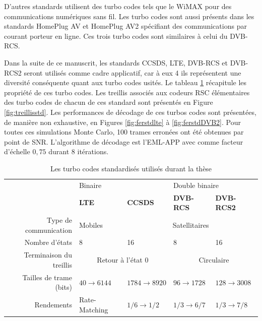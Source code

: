 D'autres standards utilisent des turbo codes tels que le WiMAX \cite{wimax} pour des  communications numériques sans fil. Les turbo codes sont aussi présents dans les standards HomePlug AV et HomePlug AV2 \cite{hpav} spécifiant des communications par courant porteur en ligne. Ces trois turbo codes sont similaires à celui du DVB-RCS.

Dans la suite de ce manuscrit, les standards CCSDS, LTE, DVB-RCS et DVB-RCS2 seront utilisés comme cadre applicatif, car à eux 4 ils représentent une diversité conséquente quant aux turbo codes usités. Le tableau \ref{tab:std} récapitule les propriété de ces turbo codes. Les treillis associés aux codeurs RSC élémentaires des turbo codes de chacun de ces standard sont présentés en Figure \ref{fig:treillisstd}. Les performances de décodage de ces turbos codes sont présentées, de manière non exhaustive, en Figures \ref{fig:ferstdlte} à \ref{fig:ferstdDVB2}. Pour toutes ces simulations Monte Carlo, 100 trames erronées ont été obtenues par point de SNR. L'algorithme de décodage est l'EML-APP avec comme facteur d'échelle $0,75$ durant 8 itérations.

\begin{table}[h]
	\centering
	\caption{Les turbo codes standardisés utilisés durant la thèse}
	\label{tab:std}
	\begin{tabular}{@{}rllll@{}}
		\toprule
		& \multicolumn{2}{l}{Binaire} & \multicolumn{2}{l}{Double binaire} \\ 
		\cmidrule(l){2-3}\cmidrule(l){4-5}
		                        & \textbf{LTE}          & \textbf{CCSDS}          & \textbf{DVB-RCS}      & \textbf{DVB-RCS2}      \\
		\cmidrule(l){2-2}\cmidrule(l){3-5}%
		Type de communication                  & Mobiles       &  \multicolumn{3}{c}{Satellitaires}                 \\
		\cmidrule(l){2-2}\cmidrule(l){3-3}\cmidrule(l){4-4}\cmidrule(l){5-5}
		Nombre d'états         & 8                     & 16                      & 8                     & 16                     \\
		\cmidrule(l){2-3}\cmidrule(l){4-5}
		Terminaison du treillis    &     \multicolumn{2}{c}{Retour à l'état 0}               &                \multicolumn{2}{c}{Circulaire}                    \\
		\cmidrule(l){2-2}\cmidrule(l){3-3}\cmidrule(l){4-4}\cmidrule(l){5-5}
		Tailles de trame (bits) & $40 \rightarrow 6144$ & $1784 \rightarrow 8920$ & $96 \rightarrow 1728$ & $128 \rightarrow 3008$ \\
		\cmidrule(l){2-2}\cmidrule(l){3-3}\cmidrule(l){4-4}\cmidrule(l){5-5}
		Rendements              & Rate-Matching         & $1/6 \rightarrow 1/2$   & $1/3 \rightarrow 6/7$ & $1/3 \rightarrow 7/8$  \\ \bottomrule
	\end{tabular}
\end{table}

